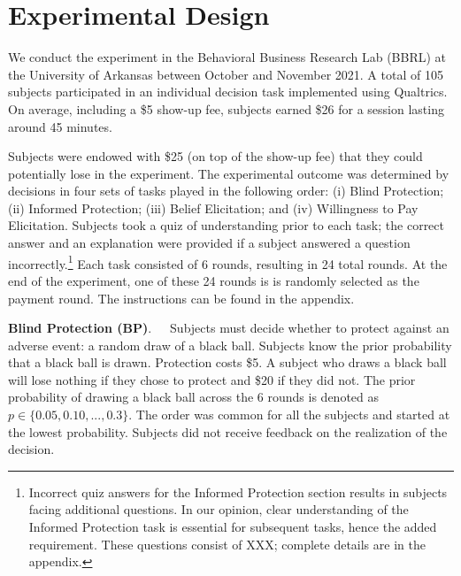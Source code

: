 \documentclass[12pt,a4paper]{article}
\begin{document}
\section{Experimental Design}

We conduct the experiment in the Behavioral Business Research Lab (BBRL) at the University of Arkansas between October and November 2021.  A total of 105 subjects participated in an individual decision task implemented using Qualtrics.  On average, including a \$5 show-up fee, subjects earned \$26 for a session lasting around 45 minutes. 
 
Subjects were endowed with \$25 (on top of the show-up fee) that they could potentially lose in the experiment. The experimental outcome was determined by decisions in four sets of tasks played in the following order: (i) Blind Protection; (ii) Informed Protection; (iii) Belief Elicitation; and (iv) Willingness to Pay Elicitation. Subjects took a quiz of understanding prior to each task; the correct answer and an explanation were provided if a subject answered a question incorrectly.\footnote{Incorrect quiz answers for the Informed Protection section results in subjects facing additional questions. In our opinion, clear understanding of the Informed Protection task is essential for subsequent tasks, hence the added requirement.  These questions consist of XXX; complete details are in the appendix.} Each task consisted of 6 rounds, resulting in 24 total rounds. At the end of the experiment, one of these 24 rounds is is randomly selected as the payment round. The instructions can be found in the appendix.


\bigskip
\noindent\textbf{Blind Protection (BP)}.\ \ \ Subjects must decide whether to protect against an adverse event: a random draw of a black ball.  Subjects know the prior probability that a black ball is drawn. Protection costs \$5. A subject who draws a black ball will lose nothing if they chose to protect and \$20 if they did not. The prior probability of drawing a black ball across the 6 rounds is denoted as $p \in \{0.05,0.10,...,0.3\}$. The order was common for all the subjects and started at the lowest probability. Subjects did not receive feedback on the realization of the decision.
\end{document}
